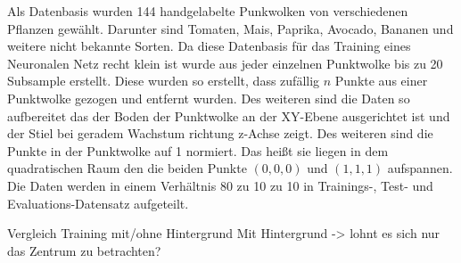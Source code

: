 \documentclass[12pt,titlepage, twoside]{article}
\begin{document}
Als Datenbasis wurden 144 handgelabelte Punkwolken von verschiedenen Pflanzen gewählt. Darunter sind Tomaten, Mais, Paprika, Avocado, Bananen und weitere nicht bekannte Sorten. 
Da diese Datenbasis für das Training eines Neuronalen Netz recht klein ist wurde aus jeder einzelnen Punktwolke bis zu 20 Subsample erstellt. Diese wurden so erstellt, dass zufällig $n$ Punkte aus einer Punktwolke gezogen und entfernt wurden.
Des weiteren sind die Daten so aufbereitet das der Boden der Punktwolke an der XY-Ebene ausgerichtet ist und der Stiel bei geradem Wachstum richtung z-Achse zeigt. Des weiteren sind die Punkte in der Punktwolke auf 1 normiert. 
Das heißt sie liegen in dem quadratischen Raum den die beiden Punkte $(0,0,0)$ und $(1,1,1)$ aufspannen. Die Daten werden in einem Verhältnis 80 zu 10 zu 10 in Trainings-, Test- und Evaluations-Datensatz aufgeteilt.

Vergleich Training mit/ohne Hintergrund
    Mit Hintergrund -> lohnt es sich nur das Zentrum zu betrachten?
\end{document}
